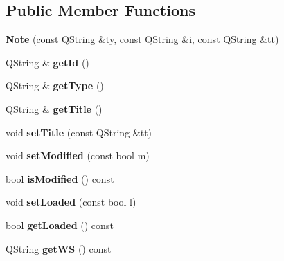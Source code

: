 \subsection*{\-Public \-Member \-Functions}
\begin{DoxyCompactItemize}
\item 
\hypertarget{classNote_a3138630ccdb6b6d422424fa94b6e4222}{{\bfseries \-Note} (const \-Q\-String \&ty, const \-Q\-String \&i, const \-Q\-String \&tt)}\label{classNote_a3138630ccdb6b6d422424fa94b6e4222}

\item 
\hypertarget{classNote_afac5dd460bebdc9f52f265b0c01f54df}{\-Q\-String \& {\bfseries get\-Id} ()}\label{classNote_afac5dd460bebdc9f52f265b0c01f54df}

\item 
\hypertarget{classNote_ad2630e09ed1356d80f1db4283cd9e4be}{\-Q\-String \& {\bfseries get\-Type} ()}\label{classNote_ad2630e09ed1356d80f1db4283cd9e4be}

\item 
\hypertarget{classNote_aef7f23af8457fede2bc63f91f32d4d0c}{\-Q\-String \& {\bfseries get\-Title} ()}\label{classNote_aef7f23af8457fede2bc63f91f32d4d0c}

\item 
\hypertarget{classNote_a86584195d7aa4a2cc1673447741c98b2}{void {\bfseries set\-Title} (const \-Q\-String \&tt)}\label{classNote_a86584195d7aa4a2cc1673447741c98b2}

\item 
\hypertarget{classNote_a2d7ffa23fe66a9e3749fc172f490350b}{void {\bfseries set\-Modified} (const bool m)}\label{classNote_a2d7ffa23fe66a9e3749fc172f490350b}

\item 
\hypertarget{classNote_abe3ea587b0371292768ce5b6cccfc796}{bool {\bfseries is\-Modified} () const }\label{classNote_abe3ea587b0371292768ce5b6cccfc796}

\item 
\hypertarget{classNote_a277285eef69e663a22180860f6c2f75c}{void {\bfseries set\-Loaded} (const bool l)}\label{classNote_a277285eef69e663a22180860f6c2f75c}

\item 
\hypertarget{classNote_a4bd73aa83650b929464c3f52d6e8e008}{bool {\bfseries get\-Loaded} () const }\label{classNote_a4bd73aa83650b929464c3f52d6e8e008}

\item 
\hypertarget{classNote_ac41c579a824b2343f969f9ab6cc4ad23}{\-Q\-String {\bfseries get\-W\-S} () const }\label{classNote_ac41c579a824b2343f969f9ab6cc4ad23}


\end{DoxyCompactItemize}

